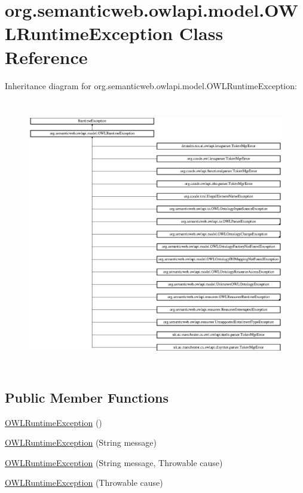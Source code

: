 \hypertarget{classorg_1_1semanticweb_1_1owlapi_1_1model_1_1_o_w_l_runtime_exception}{\section{org.\-semanticweb.\-owlapi.\-model.\-O\-W\-L\-Runtime\-Exception Class Reference}
\label{classorg_1_1semanticweb_1_1owlapi_1_1model_1_1_o_w_l_runtime_exception}
}
Inheritance diagram for org.\-semanticweb.\-owlapi.\-model.\-O\-W\-L\-Runtime\-Exception\-:\begin{figure}[H]
\begin{center}
\leavevmode
\includegraphics[height=11.875000cm]{classorg_1_1semanticweb_1_1owlapi_1_1model_1_1_o_w_l_runtime_exception}
\end{center}
\end{figure}
\subsection*{Public Member Functions}
\begin{DoxyCompactItemize}
\item 
\hyperlink{classorg_1_1semanticweb_1_1owlapi_1_1model_1_1_o_w_l_runtime_exception_a51fa820537e42290c6ac968d16863fbb}{O\-W\-L\-Runtime\-Exception} ()
\item 
\hyperlink{classorg_1_1semanticweb_1_1owlapi_1_1model_1_1_o_w_l_runtime_exception_afcd219faaea58e6751385a9b63ff8ed0}{O\-W\-L\-Runtime\-Exception} (String message)
\item 
\hyperlink{classorg_1_1semanticweb_1_1owlapi_1_1model_1_1_o_w_l_runtime_exception_a6fa534407ae287465243b3ecbc0adf8a}{O\-W\-L\-Runtime\-Exception} (String message, Throwable cause)
\item 
\hyperlink{classorg_1_1semanticweb_1_1owlapi_1_1model_1_1_o_w_l_runtime_exception_a6737090d0519f9d1ef6665a32ac86c0f}{O\-W\-L\-Runtime\-Exception} (Throwable cause)
\end{DoxyCompactItemize}
